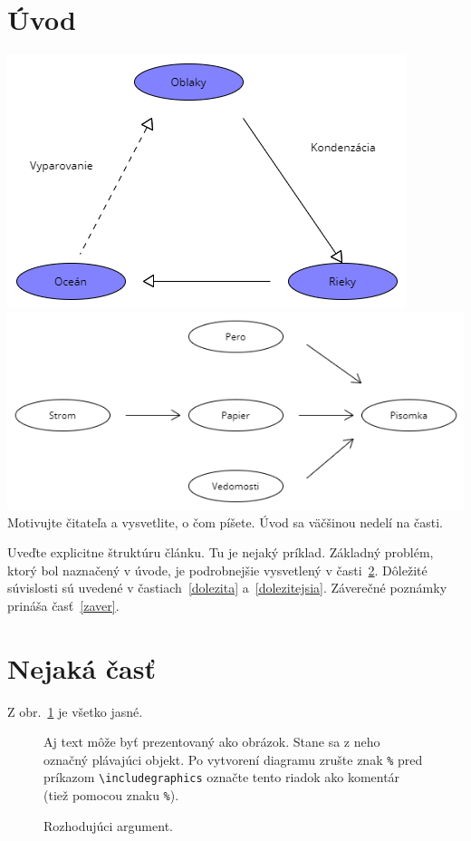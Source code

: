 \documentclass[10pt,twoside,slovak,a4paper]{article}
\begin{document}
\section{Úvod}
\includegraphics[scale=0.3]{Kolobeh_vody.png}
\includegraphics[scale=0.4]{Vznik_pisomky.png}
Motivujte čitateľa a vysvetlite, o čom píšete. Úvod sa väčšinou nedelí na časti.

Uveďte explicitne štruktúru článku. Tu je nejaký príklad.
Základný problém, ktorý bol naznačený v úvode, je podrobnejšie vysvetlený v časti~\ref{nejaka}.
Dôležité súvislosti sú uvedené v častiach~\ref{dolezita} a~\ref{dolezitejsia}.
Záverečné poznámky prináša časť~\ref{zaver}.



\section{Nejaká časť} \label{nejaka}

Z obr.~\ref{f:rozhod} je všetko jasné. 

\begin{figure}[tbh]
\centering
Aj text môže byť prezentovaný ako obrázok. Stane sa z neho označný plávajúci objekt. Po vytvorení diagramu zrušte znak \texttt{\%} pred príkazom \verb|\includegraphics| označte tento riadok ako komentár (tiež pomocou znaku \texttt{\%}).
\caption{Rozhodujúci argument.}
\label{f:rozhod}
\end{figure}
\end{document}

